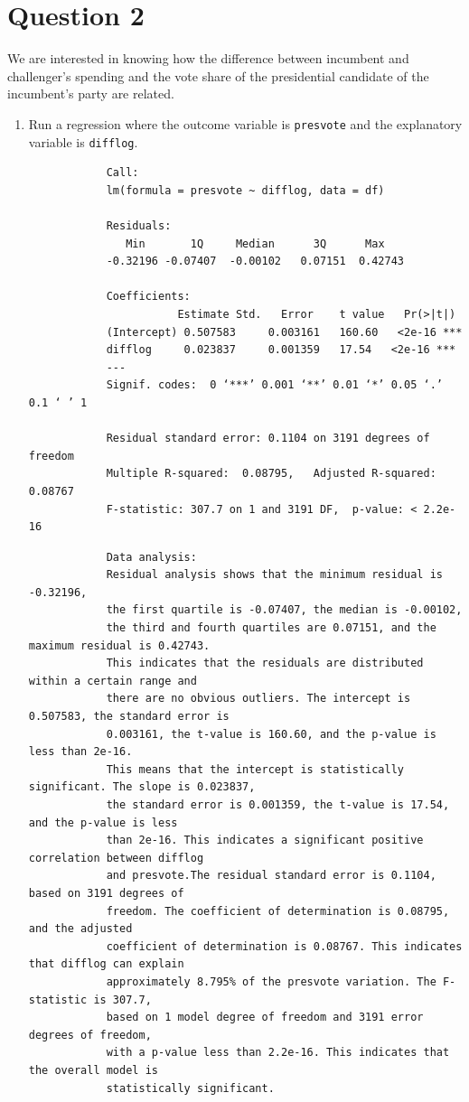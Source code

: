 \documentclass[12pt,letterpaper]{article}
\begin{document}
\section*{Question 2}
\noindent We are interested in knowing how the difference between incumbent and challenger's spending and the vote share of the presidential candidate of the incumbent's party are related.	\vspace{.25cm}
	\begin{enumerate}
		\item Run a regression where the outcome variable is \texttt{presvote} and the explanatory variable is \texttt{difflog}.	
		
		\begin{verbatim}
			Call:
			lm(formula = presvote ~ difflog, data = df)
			
			Residuals:
			   Min       1Q     Median      3Q      Max 
			-0.32196 -0.07407  -0.00102   0.07151  0.42743 
			
			Coefficients:
			           Estimate Std.   Error    t value   Pr(>|t|)    
			(Intercept) 0.507583     0.003161   160.60   <2e-16 ***
			difflog     0.023837     0.001359   17.54   <2e-16 ***
			---
			Signif. codes:  0 ‘***’ 0.001 ‘**’ 0.01 ‘*’ 0.05 ‘.’ 0.1 ‘ ’ 1
			
			Residual standard error: 0.1104 on 3191 degrees of freedom
			Multiple R-squared:  0.08795,	Adjusted R-squared:  0.08767 
			F-statistic: 307.7 on 1 and 3191 DF,  p-value: < 2.2e-16
		\end{verbatim}
		\begin{verbatim}
			Data analysis:
			Residual analysis shows that the minimum residual is -0.32196, 
			the first quartile is -0.07407, the median is -0.00102, 
			the third and fourth quartiles are 0.07151, and the maximum residual is 0.42743. 
			This indicates that the residuals are distributed within a certain range and 
			there are no obvious outliers. The intercept is 0.507583, the standard error is 
			0.003161, the t-value is 160.60, and the p-value is less than 2e-16. 
			This means that the intercept is statistically significant. The slope is 0.023837,
			the standard error is 0.001359, the t-value is 17.54, and the p-value is less 
			than 2e-16. This indicates a significant positive correlation between difflog 
			and presvote.The residual standard error is 0.1104, based on 3191 degrees of 
			freedom. The coefficient of determination is 0.08795, and the adjusted 
			coefficient of determination is 0.08767. This indicates that difflog can explain 
			approximately 8.795% of the presvote variation. The F-statistic is 307.7, 
			based on 1 model degree of freedom and 3191 error degrees of freedom, 
			with a p-value less than 2.2e-16. This indicates that the overall model is 
			statistically significant.
			

\end{verbatim}
\end{enumerate}
\end{document}

